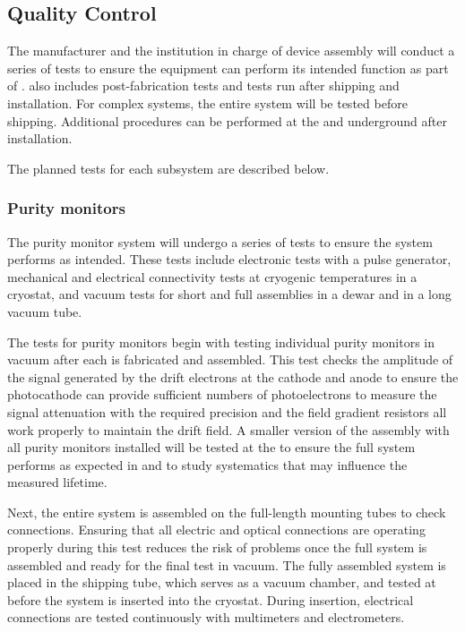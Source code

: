 \subsection{Quality Control}
\label{sec:fdsp-slow-cryo-qc}
The manufacturer and the institution in charge of device assembly will conduct a series of tests to ensure the equipment can perform its intended function as part of .  also includes post-fabrication tests and tests run after shipping and installation. For complex systems, the entire system will be tested before shipping. 
Additional  procedures can be performed at the  and underground after installation. %

The planned tests for each subsystem are described below.  


\subsubsection{Purity monitors}
\label{sec:fdgen-slow-cryo-qc-pm}


The purity monitor system will undergo a series of tests to ensure the
system performs as intended. These tests 
include electronic tests
with a pulse generator, mechanical and electrical connectivity tests
at cryogenic temperatures in a cryostat, and vacuum tests for short
and full assemblies in a dewar and in a long vacuum tube.

The  tests for  purity monitors begin with testing
individual purity monitors in vacuum after each is fabricated and
assembled.  This test checks the amplitude of the signal generated by
the drift electrons at the cathode and anode to ensure the
photocathode can provide sufficient numbers of photoelectrons to
measure the signal attenuation
with the required precision and the field gradient resistors all work properly to maintain the drift field. %
A smaller version of the assembly with all purity monitors installed will be tested at the 
to ensure the full system performs as expected in  and to study systematics that may influence the measured lifetime.

Next, %
the entire system %
is assembled on the full-length mounting tubes to check connections.  Ensuring that all electric and optical connections are operating properly during this test reduces the risk of problems once the full system is assembled and ready for the final test in vacuum.  %
The fully assembled system %
is placed in the shipping tube, which %
serves as a vacuum chamber, and tested at \surf %
 before the system is inserted into the  %
 cryostat. During insertion, electrical connections %
 are tested continuously with multimeters and electrometers. 


